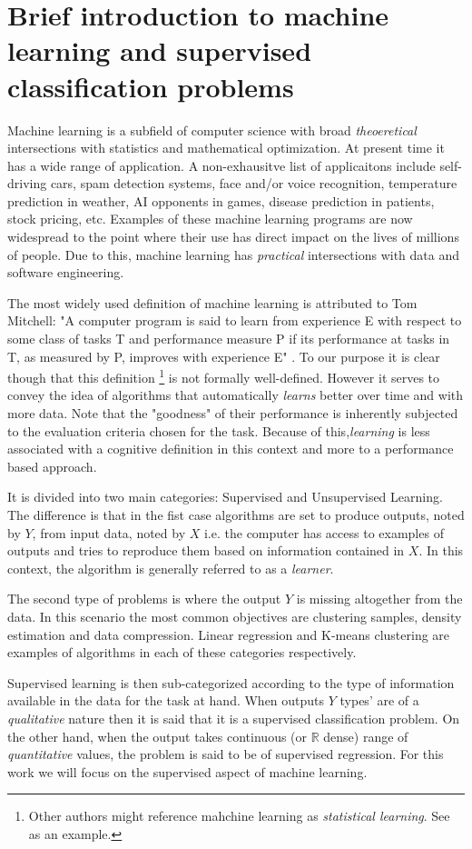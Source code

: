 
\section{ Brief introduction to machine learning and supervised classification problems}

Machine learning is a subfield of computer science with broad \textit{theoeretical} intersections with statistics and mathematical optimization. At present time it has a wide range of application. A non-exhausitve list of applicaitons include self-driving cars, spam detection systems, face and/or voice recognition, temperature prediction in weather, AI opponents in games, disease prediction in patients, stock pricing, etc. Examples of these machine learning programs are now widespread to the point where their use has direct impact on the lives of millions of people. Due to this, machine learning has \textit{practical} intersections with data and software engineering.

The most widely used definition of machine learning is attributed to Tom Mitchell: 	 
"A computer program is said to learn from experience E with respect to some class of tasks T and performance measure P if its performance at tasks in T, as measured by P, improves with experience E" \cite{Mitchell-MLearning}. To our purpose it is clear though that this definition \footnote{Other authors might reference mahchine learning as \textit{statistical learning}. See \cite{hastie-elemstatslearn} as an example.} is not formally well-defined. However it serves to convey the idea of algorithms that automatically \textit{learns} better over time and with more data. Note that the "goodness" of their performance is inherently subjected to the evaluation criteria chosen for the task. Because of this,\textit{learning} is less associated with a cognitive definition in this context and more to a performance based approach.

It is divided into two main categories: Supervised and Unsupervised Learning. The difference is that in the fist case algorithms are set to produce outputs, noted by $Y$, from input data, noted by $X$ i.e. the computer has access to examples of outputs and tries to reproduce them based on information contained in $X$. In this context, the algorithm is generally referred to as a \textit{learner}.

The second type of problems is where the output $Y$ is missing altogether from the data. In this scenario the most common objectives are clustering samples, density estimation and data compression. Linear regression and K-means clustering are examples of algorithms in each of these categories respectively.

Supervised learning is then sub-categorized according to the type of information available in the data for the task at hand. When outputs $Y$ types' are of a \textit{qualitative} nature then it is said that it is a supervised classification problem. On the other hand, when the output takes continuous (or $\mathbb{R}$ dense) range of \textit{quantitative} values, the problem is said to be of supervised regression. For this work we will focus on the supervised aspect of machine learning.